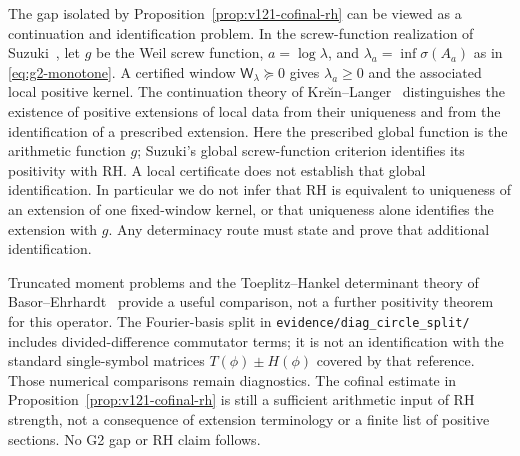 The gap isolated by Proposition~\ref{prop:v121-cofinal-rh} can be
viewed as a continuation and identification problem. In the screw-function
realization of Suzuki~\cite{Suzuki2026}, let $g$ be the Weil screw
function, $a=\log\lambda$, and $\lambda_a=\inf\sigma(A_a)$ as in
\eqref{eq:g2-monotone}. A certified window
$\mathsf W_\lambda\succeq0$ gives $\lambda_a\ge0$ and the associated
local positive kernel. The continuation theory of
Kre\u{\i}n--Langer~\cite{KreinLanger2014} distinguishes the existence of
positive extensions of local data from their uniqueness and from the
identification of a prescribed extension. Here the prescribed global
function is the arithmetic function $g$; Suzuki's global screw-function
criterion identifies its positivity with RH. A local certificate does
not establish that global identification. In particular we do not infer
that RH is equivalent to uniqueness of an extension of one fixed-window
kernel, or that uniqueness alone identifies the extension with $g$.
Any determinacy route must state and prove that additional identification.

Truncated moment problems and the Toeplitz--Hankel determinant theory
of Basor--Ehrhardt~\cite{BasorEhrhardt2002} provide a useful comparison,
not a further positivity theorem for this operator. The Fourier-basis
split in \texttt{evidence/diag\_circle\_split/} includes divided-difference
commutator terms; it is not an identification with the standard
single-symbol matrices $T(\phi)\pm H(\phi)$ covered by that reference.
Those numerical comparisons remain diagnostics. The cofinal estimate in
Proposition~\ref{prop:v121-cofinal-rh} is still a sufficient arithmetic
input of RH strength, not a consequence of extension terminology or a
finite list of positive sections. No G2 gap or RH claim follows.
